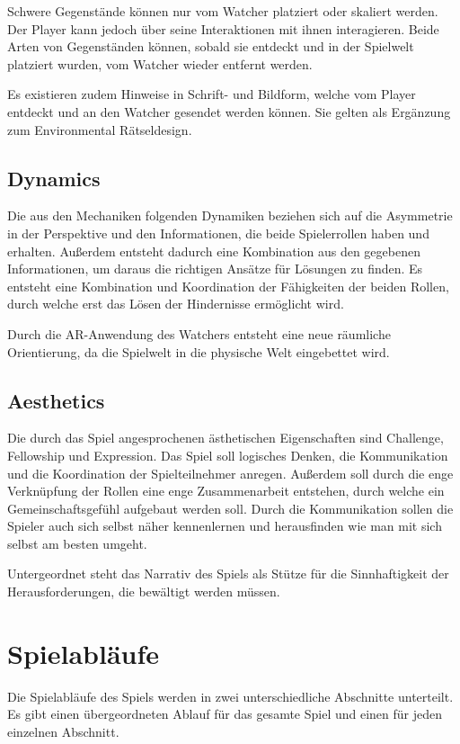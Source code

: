 Schwere Gegenstände können nur vom Watcher platziert oder skaliert werden. Der Player kann jedoch über seine Interaktionen mit ihnen interagieren. Beide Arten von Gegenständen können, sobald sie entdeckt und in der Spielwelt platziert wurden, vom Watcher wieder entfernt werden.

Es existieren zudem Hinweise in Schrift- und Bildform, welche vom Player entdeckt und an den Watcher gesendet werden können. Sie gelten als Ergänzung zum Environmental Rätseldesign.

\subsection{Dynamics}
Die aus den Mechaniken folgenden Dynamiken beziehen sich auf die Asymmetrie in der Perspektive und den Informationen, die beide Spielerrollen haben und erhalten. Außerdem entsteht dadurch eine Kombination aus den gegebenen Informationen, um daraus die richtigen Ansätze für Lösungen zu finden. 
Es entsteht eine Kombination und Koordination der Fähigkeiten der beiden Rollen, durch welche erst das Lösen der Hindernisse ermöglicht wird.

Durch die AR-Anwendung des Watchers entsteht eine neue räumliche Orientierung, da die Spielwelt in die physische Welt eingebettet wird.


\subsection{Aesthetics}
Die durch das Spiel angesprochenen ästhetischen Eigenschaften sind Challenge, Fellowship und Expression. Das Spiel soll logisches Denken, die Kommunikation und die Koordination der Spielteilnehmer anregen. Außerdem soll durch die enge Verknüpfung der Rollen eine enge Zusammenarbeit entstehen, durch welche ein Gemeinschaftsgefühl aufgebaut werden soll. Durch die Kommunikation sollen die Spieler auch sich selbst näher kennenlernen und herausfinden wie man mit sich selbst am besten umgeht.

Untergeordnet steht das Narrativ des Spiels als Stütze für die Sinnhaftigkeit der Herausforderungen, die bewältigt werden müssen.


\section{Spielabläufe}
Die Spielabläufe des Spiels werden in zwei unterschiedliche Abschnitte unterteilt. Es gibt einen übergeordneten Ablauf für das gesamte Spiel und einen für jeden einzelnen Abschnitt.

